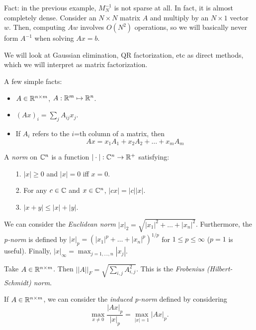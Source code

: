 \documentclass{article}
\begin{document}
Fact: in the previous example, $M_N^{-1}$ is not sparse at all. In fact, it is almost completely dense. Consider an $N \times N$ matrix $A$ and multiply by an $N \times 1$ vector $w$. Then, computing $Aw$ involves $O(N^2)$ operations, so we will basically never form $A^{-1}$ when solving $Ax = b$. 
\newpar

We will look at Gaussian elimination, QR factorization, etc as direct methods, which we will interpret as matrix factorization. 
\newpar

A few simple facts:
\begin{itemize}[noitemsep]
    \item $A \in \mathbb{R}^{n \times m}$, $A: \mathbb{R}^m \mapsto \mathbb{R}^n$.
    \item $(Ax)_i = \sum_j A_{ij} x_j$.
    \item If $A_i$ refers to the $i$=th column of a matrix, then 
        \[Ax = x_1 A_1 + x_2 A_2 + \hdots + x_m A_m \]
\end{itemize}

\begin{definition}
    A \textit{norm} on $\mathbb{C}^n$ is a function $| \cdot | : \mathbb{C}^n \to \mathbb{R}^+$ satisfying:
    \begin{itemize}[noitemsep, nolistsep]
        \item[1.] $|x| \geq 0$ and $|x| = 0$ iff $x = 0$.
        \item[2.] For any $c \in \mathbb{C}$ and $x \in \mathbb{C}^n$, $|cx| = |c||x|$. 
        \item[3.] $|x + y| \leq |x| + |y|$.   
    \end{itemize}
\end{definition}
\begin{definition}
    We can consider the \textit{Euclidean norm} $|x|_2 = \sqrt{|x_1|^2 + \hdots + |x_n|^2}$. Furthermore, the \textit{p-norm} is defined by $|x|_p = \left(|x_1|^p + \hdots + |x_n|^p\right)^{1/p}$ for $1 \leq p \leq \infty$ ($p = 1$ is useful). Finally, $|x|_\infty = \max_{j = 1, \hdots, n} |x_j|$.  
\end{definition}

\begin{definition}
    Take $A \in \mathbb{R}^{n \times m}$. Then $||A||_F = \sqrt{\sum_{i, j} A_{i, j}^2}$. This is the \textit{Frobenius (Hilbert-Schmidt) norm}.
\end{definition}

\begin{definition}
    If $A \in \mathbb{R}^{n \times m}$, we can consider the \textit{induced p-norm} defined by considering 
        \[\max_{x \neq 0} \frac{|Ax|_p}{|x|_p} = \max_{|x| = 1}|Ax|_p.\]
\end{definition}
\end{document}
